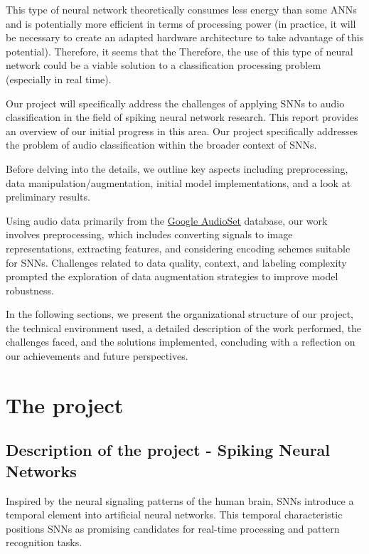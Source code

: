 \documentclass[11pt]{article}
\begin{document}
This type of neural network theoretically consumes less energy than some ANNs and is potentially more efficient in terms of processing power (in practice, it will be necessary to create an adapted hardware architecture to take advantage of this potential). Therefore, it seems that the
Therefore, the use of this type of neural network could be a viable solution to a classification processing problem (especially in real time).

Our project will specifically address the challenges of applying SNNs to audio classification in the field of spiking neural network research. This report provides an overview of our initial progress in this area. Our project specifically addresses the problem of audio classification within the broader context of SNNs.

Before delving into the details, we outline key aspects including preprocessing, data manipulation/augmentation, initial model implementations, and a look at preliminary results.

Using audio data primarily from the \href{https://research.google.com/audioset/}{Google AudioSet} database, our work involves preprocessing, which includes converting signals to image representations, extracting features, and considering encoding schemes suitable for SNNs. Challenges related to data quality, context, and labeling complexity prompted the exploration of data augmentation strategies to improve model robustness.



In the following sections, we present the organizational structure of our project, the technical environment used, a detailed description of the work performed, the challenges faced, and the solutions implemented, concluding with a reflection on our achievements and future perspectives.


\pagebreak

\section{The project}

\subsection{Description of the project - Spiking Neural Networks}

Inspired by the neural signaling patterns of the human brain, SNNs introduce a temporal element into artificial neural networks. This temporal characteristic positions SNNs as promising candidates for real-time processing and pattern recognition tasks.
\end{document}
